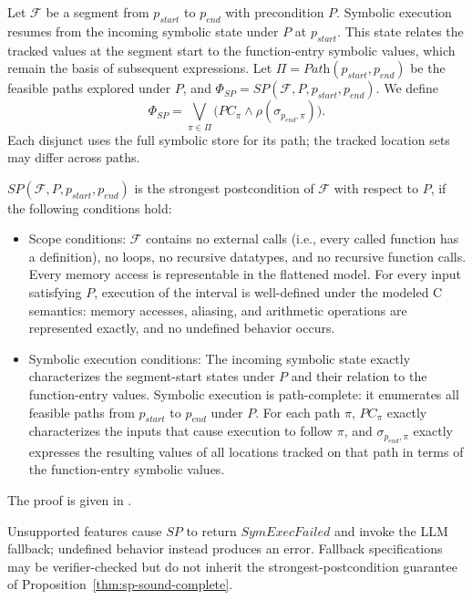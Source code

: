 Let $\mathcal{F}$ be a segment from $p_{\textit{start}}$ to $p_{\textit{end}}$ with precondition $P$. {Symbolic execution resumes from the incoming symbolic state under $P$ at $p_{\textit{start}}$. This state relates the tracked values at the segment start to the function-entry symbolic values, which remain the basis of subsequent expressions. Let $\Pi=\textit{Path}(p_{\textit{start}},p_{\textit{end}})$ be the feasible paths explored under $P$, and $\Phi_{\mathit{SP}}=\textit{SP}(\mathcal{F},P,p_{\textit{start}},p_{\textit{end}})$. We define
\[
\Phi_{\mathit{SP}}
 = \bigvee_{\pi\in\Pi}\bigl(PC_\pi
 \land\rho(\sigma_{p_{\textit{end}},\pi})\bigr).
\]
Each disjunct uses the full symbolic store for its path; the tracked location sets may differ across paths.}

{
\begin{proposition}
\label{thm:sp-sound-complete}
$\textit{SP}(\mathcal{F},P,p_{\textit{start}},p_{\textit{end}})$ is the strongest postcondition of $\mathcal{F}$ with respect to $P$, if the following conditions hold:
\begin{itemize}
    \item[(A1)] Scope conditions: $\mathcal{F}$ contains no external calls (i.e., every called function has a definition), no loops, no recursive datatypes, and no recursive function calls. Every memory access is representable in the flattened model. For every input satisfying $P$, execution of the interval is well-defined under the modeled C semantics: memory accesses, aliasing, and arithmetic operations are represented exactly, and no undefined behavior occurs.
    \item[(A2)] Symbolic execution conditions: The incoming symbolic state exactly characterizes the segment-start states under $P$ and their relation to the function-entry values. Symbolic execution is path-complete: it enumerates all feasible paths from $p_{\textit{start}}$ to $p_{\textit{end}}$ under $P$. For each path $\pi$, $PC_\pi$ exactly characterizes the inputs that cause execution to follow $\pi$, and $\sigma_{p_{\textit{end}},\pi}$ exactly expresses the resulting values of all locations tracked on that path in terms of the function-entry symbolic values.
\end{itemize}
\end{proposition}
}

{The proof is given in .}

Unsupported features cause $\textit{SP}$ to return $\textit{SymExecFailed}$ and invoke the LLM fallback; {undefined behavior instead produces an error.} Fallback specifications may be verifier-checked but do not inherit the strongest-postcondition guarantee of {Proposition~\ref{thm:sp-sound-complete}}.

